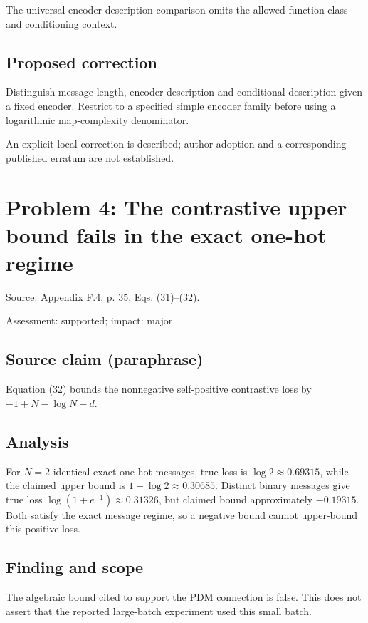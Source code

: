 \documentclass[11pt]{article}
\begin{document}
The universal encoder-description comparison omits the allowed function class and conditioning context.

\subsection*{Proposed correction}

Distinguish message length, encoder description and conditional description given a fixed encoder. Restrict to a specified simple encoder family before using a logarithmic map-complexity denominator.

An explicit local correction is described; author adoption and a corresponding published erratum are not established.

\section*{Problem 4: The contrastive upper bound fails in the exact one-hot regime}

Source: Appendix F.4, p. 35, Eqs. (31)–(32).

Assessment: supported; impact: major

\subsection*{Source claim (paraphrase)}

Equation (32) bounds the nonnegative self-positive contrastive loss by \(-1+N-\log N-\bar d\).

\subsection*{Analysis}

For \(N=2\) identical exact-one-hot messages, true loss is \(\log2\approx0.69315\), while the claimed upper bound is \(1-\log2\approx0.30685\). Distinct binary messages give true loss \(\log(1+e^{-1})\approx0.31326\), but claimed bound approximately \(-0.19315\). Both satisfy the exact message regime, so a negative bound cannot upper-bound this positive loss.

\subsection*{Finding and scope}

The algebraic bound cited to support the PDM connection is false. This does not assert that the reported large-batch experiment used this small batch.
\end{document}
